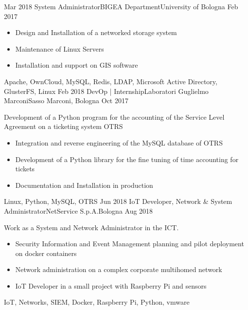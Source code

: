 %
%
%

\begin{experiences}
  \experience
    {Mar 2018}   {System Administrator}{BIGEA Department}{University of Bologna}
    {Feb 2017} {
                      \begin{itemize}
                        \item Design and Installation of a networked storage system
                        \item Maintenance of Linux Servers
                        \item Installation and support on GIS software
                      \end{itemize}
                    }
                    {Apache, OwnCloud, MySQL, Redis, LDAP, Microsoft Active Directory, GlusterFS, Linux}
  \experience
    {Feb 2018} {DevOp | Internship}{Laboratori Guglielmo Marconi}{Sasso Marconi, Bologna}
    {Oct 2017}    {
                      Development of a Python program for the accounting of the Service Level Agreement on a ticketing system OTRS
                      \begin{itemize}
                        \item Integration and reverse engineering of the MySQL database of OTRS
                        \item Development of a Python library for the fine tuning of time accounting for tickets
                        \item Documentation and Installation in production
                      \end{itemize}
                    }
                    {Linux, Python, MySQL, OTRS}
  \emptySeparator
  \experience
  {Jun 2018} {IoT Developer, Network \& System Administrator}{NetService S.p.A.}{Bologna}
  {Aug 2018}    {
                    Work as a System and Network Administrator in the ICT.
                    \begin{itemize}
                      \item Security Information and Event Management planning and pilot deployment on docker containers
                      \item Network administration on a complex corporate multihomed network 
                      \item IoT Developer in a small project with Raspberry Pi and sensors
                    \end{itemize}
                  }
                  {IoT, Networks, SIEM, Docker, Raspberry Pi, Python, vmware}
\emptySeparator
\end{experiences}
